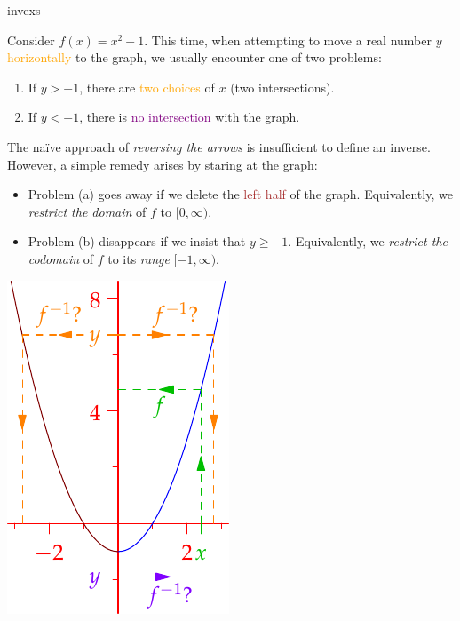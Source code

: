 \begin{examples}{}{invexs}
\begin{enumerate}
		\begin{minipage}[t]{0.71\linewidth}\vspace{-5pt}
			\item\label{ex:invexs1} Consider $f(x)=x^2-1$. This time, when attempting to move a real number $y$ \textcolor{orange}{horizontally} to the graph, we usually encounter one of two problems:
			\begin{enumerate}\itemsep2pt
			  \item If $y>-1$, there are \textcolor{orange}{two choices} of $x$ (two intersections).
			  \item If $y<-1$, there is \textcolor{Purple}{no intersection} with the graph.
			\end{enumerate}
			The naïve approach of \emph{reversing the arrows} is insufficient to define an inverse. However, a simple remedy arises by staring at the graph:
			\begin{itemize}\itemsep2pt
			  \item Problem (a) goes away if we delete the \textcolor{Brown}{left half} of the graph. Equivalently, we \emph{restrict the domain} of $f$ to $[0,\infty)$. 
			  \item Problem (b) disappears if we insist that $y\ge-1$. Equivalently, we \emph{restrict the codomain} of $f$ to its \emph{range} $[-1,\infty)$. 
			\end{itemize}
		\end{minipage}
		\hfill
		\begin{minipage}[t]{0.28\linewidth}\vspace{0pt}
			\flushright
			\includegraphics{inverses-quad}
		\end{minipage}

\end{enumerate}
\end{examples}
